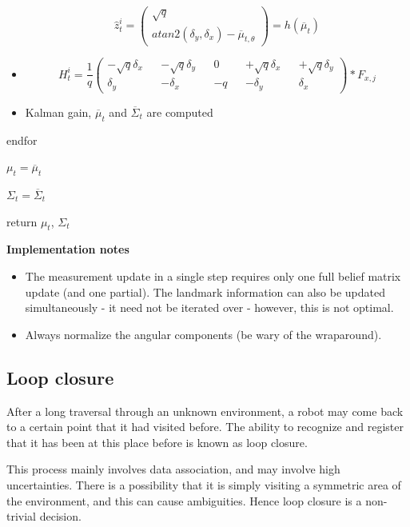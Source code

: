\documentclass[a4paper]{article}
\begin{document}
\begin{itemize}
\begin{equation*}
        \hat{z}_t^i = 
        \begin{pmatrix}
                \sqrt{q} \\ atan2(\delta_y, \delta_x) - \overline{\mu}_{t, \theta}
        \end{pmatrix} 
        = 
        h(\overline{\mu}_t)
    \end{equation*}
    \item \begin{equation*}
        H_t^i = \frac{1}{q} 
        \begin{pmatrix}
            -\sqrt{q} \delta_x && -\sqrt{q} \delta_y && 0 && +\sqrt{q} \delta_x && +\sqrt{q} \delta_y
            \\
            \delta_y && -\delta_x && -q && -\delta_y && \delta_x
        \end{pmatrix}
         * F_{x,j}
    \end{equation*}
    \item Kalman gain, $\overline{\mu}_t$ and $\overline{\Sigma}_t$ are computed
\end{itemize}

endfor

$\mu_t = \overline{\mu}_t$

$\Sigma_t = \overline{\Sigma}_t$

return $\mu_t$, $\Sigma_t$

\textbf{Implementation notes}

\begin{itemize}
    \item The measurement update in a single step requires only one full belief matrix update (and one partial). The landmark information can also be updated simultaneously - it need not be iterated over - however, this is not optimal.
    \item Always normalize the angular components (be wary of the wraparound).
\end{itemize}

\subsection{Loop closure}

After a long traversal through an unknown environment, a robot may come back to a certain point that it had visited before. The ability to recognize and register that it has been at this place before is known as loop closure.

This process mainly involves data association, and may involve high uncertainties. There is a possibility that it is simply visiting a symmetric area of the environment, and this can cause ambiguities. Hence loop closure is a non-trivial decision.
\end{document}
